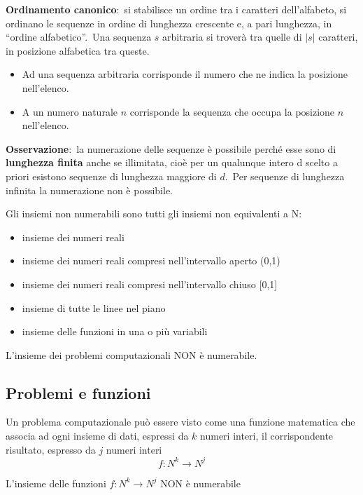 \noindent\textbf{Ordinamento canonico}:\ si stabilisce un ordine tra i caratteri dell'alfabeto, si ordinano le sequenze in ordine di lunghezza crescente e, a pari lunghezza, in ``ordine alfabetico''.\
Una sequenza $s$ arbitraria si troverà tra quelle di $|s|$ caratteri, in posizione alfabetica tra queste.\
\begin{itemize}
    \item Ad una sequenza arbitraria corrisponde il numero che ne indica la posizione nell'elenco.
    \item A un numero naturale $n$ corrisponde la sequenza che occupa la posizione $n$ nell'elenco.
\end{itemize}

\noindent\textbf{Osservazione}:\ la numerazione delle sequenze è possibile perché esse sono di \textbf{lunghezza finita} anche se illimitata, cioè per un qualunque intero d scelto a priori esistono sequenze di lunghezza maggiore di $d$.\
Per sequenze di lunghezza infinita la numerazione non è possibile.

Gli insiemi non numerabili sono tutti gli insiemi non equivalenti a N:
\begin{itemize}
    \item insieme dei numeri reali
    \item insieme dei numeri reali compresi nell'intervallo aperto (0,1)
    \item insieme dei numeri reali compresi nell'intervallo chiuso [0,1]
    \item insieme di tutte le linee nel piano
    \item insieme delle funzioni in una o più variabili
\end{itemize}

\begin{center}
    L'insieme dei problemi computazionali NON è numerabile.\
\end{center}

\subsection{Problemi e funzioni}

Un problema computazionale può essere visto come una funzione matematica che associa ad ogni insieme di dati, espressi da $k$ numeri interi, il corrispondente risultato, espresso da $j$ numeri interi
\[f: N^k \rightarrow N^j\]
\begin{center}
    L'insieme delle funzioni $f: N^k \rightarrow N^j$ NON è numerabile
\end{center}

